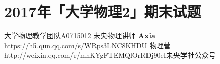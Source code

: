\chapter{2017年「大学物理2」期末试题}
\date{2018年1月22日}{大学物理教学团队}{A0715012}
{未央物理讲师 \href{https://qm.qq.com/q/UPbGudx8cK}{\textbf{Axia}}}
{https://h5.qun.qq.com/s/WRps3LNC8K}{HDU 物理营}
{http://weixin.qq.com/r/mhKYgFTEMQlOrRDj90eI}{未央学社公众号}